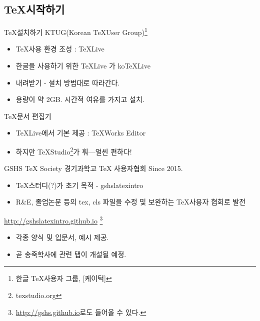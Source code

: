 \documentclass[12pt]{beamer}
\begin{document}
\subsection{\TeX 시작하기}
\begin{frame}{\TeX 설치하기}
	KTUG(Korean \TeX User Group)\footnote{한글 \TeX 사용자 그룹, [케이턱]}
	\begin{itemize}
		\item \TeX 사용 환경 조성 : TeXLive
		\item 한글을 사용하기 위한 TeXLive 가 koTeXLive
		\item 내려받기 - 설치 방법대로 따라간다.
		\item 용량이 약 2GB. 시간적 여유를 가지고 설치.
	\end{itemize}
	\TeX 문서 편집기
	\begin{itemize}
		\item TeXLive에서 기본 제공 : TeXWorks Editor
		\item 하지만 TeXStudio\footnote{texstudio.org}가 훠---얼씬 편하다!
	\end{itemize}
\end{frame}
\begin{frame}{GSHS TeX Society}
	경기과학고 TeX 사용자협회 Since 2015.
	\begin{itemize}
		\item \TeX 스터디(?)가 초기 목적 - gshslatexintro
		\item R\&E, 졸업논문 등의 tex, cls 파일을 수정 및 보완하는 \TeX 사용자 협회로 발전
	\end{itemize}
	\url{http://gshslatexintro.github.io} \footnote{\url{http://gshs.github.io}로도 들어올 수 있다.}
	\begin{itemize}
		\item 각종 양식 및 입문서, 예시 제공.
		\item 곧 송죽학사에 관련 탭이 개설될 예정.
	\end{itemize}
\end{frame}
\end{document}
